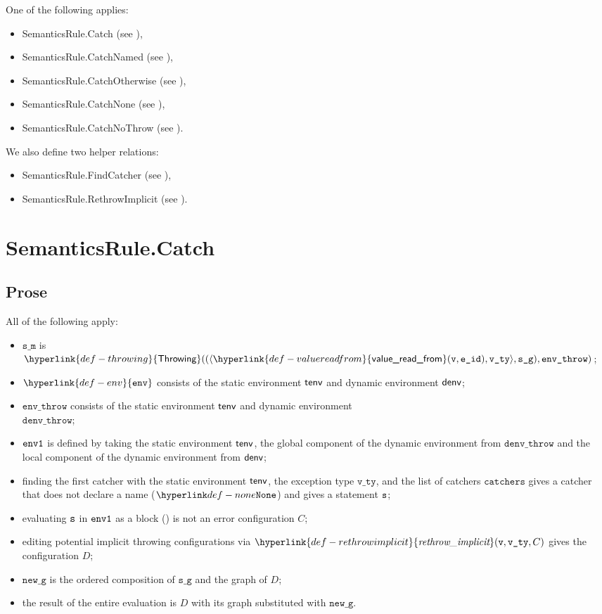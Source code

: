 \documentclass{book}
\newcommand\ErrorConfig[0]{\hyperlink{def-errorconfig}{\texttt{\#DE}}}
\newcommand\ProseOrError[0]{\ProseTerminateAs{\ErrorConfig}}
\newcommand\rethrowimplicit[0]{\hyperlink{def-rethrowimplicit}{\textfunc{rethrow\_implicit}}}
\newcommand\valuereadfrom[0]{\hyperlink{def-valuereadfrom}{\textsf{value\_read\_from}}}
\newcommand\Throwing[0]{\hyperlink{def-throwing}{\textsf{Throwing}}}
\newcommand\env[0]{\hyperlink{def-env}{\texttt{env}}}
\newcommand\newg[0]{\texttt{new\_g}}
\newcommand\catchers[0]{\texttt{catchers}}
\newcommand\envthrow[0]{\texttt{env\_throw}}
\newcommand\denvthrow[0]{\texttt{denv\_throw}}
\newcommand\sm[0]{\texttt{s\_m}}
\newcommand\sg[0]{\texttt{s\_g}}
\newcommand\vvty[0]{\texttt{v\_ty}}
\newcommand\eid[0]{\texttt{e\_id}}
\begin{document}
One of the following applies:
\begin{itemize}
\item SemanticsRule.Catch (see ),
\item SemanticsRule.CatchNamed (see ),
\item SemanticsRule.CatchOtherwise (see ),
\item SemanticsRule.CatchNone (see ),
\item SemanticsRule.CatchNoThrow (see ).
\end{itemize}

We also define two helper relations:
\begin{itemize}
  \item SemanticsRule.FindCatcher (see ),
  \item SemanticsRule.RethrowImplicit (see ).
\end{itemize}

\section{SemanticsRule.Catch \label{sec:SemanticsRule.Catch}}
\subsection{Prose}
All of the following apply:
\begin{itemize}
  \item $\sm$ is $\Throwing((\langle \valuereadfrom(\vv, \eid), \vvty \rangle, \sg), \envthrow)$;
  \item $\env$ consists of the static environment $\textsf{tenv}$ and dynamic environment $\textsf{denv}$;
  \item $\envthrow$ consists of the static environment $\textsf{tenv}$ and dynamic environment \\ $\denvthrow$;
  \item $\texttt{env1}$ is defined by taking the static environment $\textsf{tenv}$, the global component of the dynamic
        environment from $\denvthrow$ and the local component of the dynamic environment from $\textsf{denv}$;
  \item finding the first catcher with the static environment $\textsf{tenv}$, the exception type $\vvty$,
  and the list of catchers $\catchers$ gives a catcher that does not declare a name ($\None$) and gives a statement $\texttt{s}$;
  \item evaluating $\texttt{s}$ in $\texttt{env1}$ as a block () is not an error
        configuration $C$\ProseOrError;
  \item editing potential implicit throwing configurations via $\rethrowimplicit(\vv, \vvty, C)$
        gives the configuration $D$;
  \item $\newg$ is the ordered composition of $\sg$ and the graph of $D$;
  \item the result of the entire evaluation is $D$ with its graph substituted with $\newg$.
\end{itemize}
\end{document}
